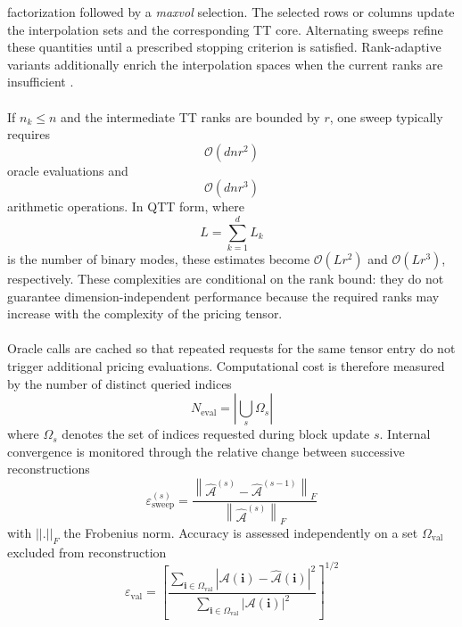 \documentclass{article}
\numberwithin{equation}{subsection}
\theoremstyle{definition}
\theoremstyle{remark}
\begin{document}
factorization followed by a \emph{maxvol} selection. The selected rows or
columns update the interpolation sets and the corresponding TT core.
Alternating sweeps refine these quantities until a prescribed stopping
criterion is satisfied. Rank-adaptive variants additionally enrich the
interpolation spaces when the current ranks are insufficient
\cite{oseledets2010ttcross,chertkov2023anovaTT}.\\
\\
If \(n_k\leq n\) and the intermediate TT ranks are bounded by \(r\), one sweep
typically requires
\begin{equation}
\mathcal{O}\!\left(dnr^2\right)
\end{equation}
oracle evaluations and
\begin{equation}
\mathcal{O}\!\left(dnr^3\right)
\end{equation}
arithmetic operations. In QTT form, where
\begin{equation}
L=\sum_{k=1}^{d}L_k
\end{equation}
is the number of binary modes, these estimates become
\(\mathcal{O}(Lr^2)\) and \(\mathcal{O}(Lr^3)\), respectively. These
complexities are conditional on the rank bound: they do not guarantee
dimension-independent performance because the required ranks may increase
with the complexity of the pricing tensor.\\
\\
Oracle calls are cached so that repeated requests for the same tensor entry do
not trigger additional pricing evaluations. Computational cost is therefore
measured by the number of distinct queried indices
\begin{equation}
N_{\mathrm{eval}}
=
\left|
\bigcup_s \Omega_s
\right|
\end{equation}
where \(\Omega_s\) denotes the set of indices requested during block update
\(s\).
Internal convergence is monitored through the relative change between
successive reconstructions
\begin{equation}
\varepsilon_{\mathrm{sweep}}^{(s)}
=
\frac{
\left\|
\widehat{\mathcal{A}}^{(s)}
-
\widehat{\mathcal{A}}^{(s-1)}
\right\|_F
}{
\left\|
\widehat{\mathcal{A}}^{(s)}
\right\|_F
}
\end{equation}
with $||.||_F$ the Frobenius norm. 
Accuracy is assessed independently on a set
\(\Omega_{\mathrm{val}}\) excluded from reconstruction
\begin{equation}
\varepsilon_{\mathrm{val}}
=
\left[
\frac{
\displaystyle
\sum_{\boldsymbol{i}\in\Omega_{\mathrm{val}}}
\left|
\mathcal{A}(\boldsymbol{i})
-
\widehat{\mathcal{A}}(\boldsymbol{i})
\right|^2
}{
\displaystyle
\sum_{\boldsymbol{i}\in\Omega_{\mathrm{val}}}
\left|
\mathcal{A}(\boldsymbol{i})
\right|^2
}
\right]^{1/2}
\end{equation}
\end{document}
